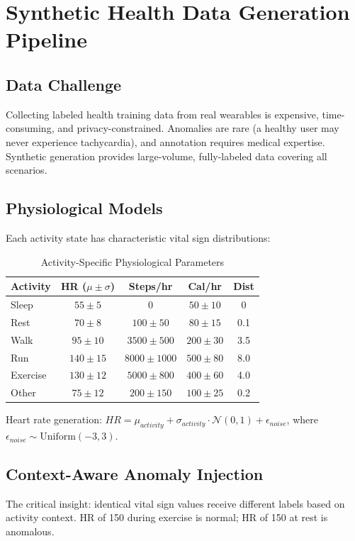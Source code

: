 \section{Synthetic Health Data Generation Pipeline}

\subsection{Data Challenge}
Collecting labeled health training data from real wearables is expensive, time-consuming, and privacy-constrained. Anomalies are rare (a healthy user may never experience tachycardia), and annotation requires medical expertise. Synthetic generation provides large-volume, fully-labeled data covering all scenarios.

\subsection{Physiological Models}
Each activity state has characteristic vital sign distributions:

\begin{table}[H]
\centering
\caption{Activity-Specific Physiological Parameters}
\label{tab:physio}
\begin{tabular}{lcccc}
\toprule
\textbf{Activity} & \textbf{HR ($\mu \pm \sigma$)} & \textbf{Steps/hr} & \textbf{Cal/hr} & \textbf{Dist} \\
\midrule
Sleep & $55 \pm 5$ & 0 & $50 \pm 10$ & 0 \\
Rest & $70 \pm 8$ & $100 \pm 50$ & $80 \pm 15$ & 0.1 \\
Walk & $95 \pm 10$ & $3500 \pm 500$ & $200 \pm 30$ & 3.5 \\
Run & $140 \pm 15$ & $8000 \pm 1000$ & $500 \pm 80$ & 8.0 \\
Exercise & $130 \pm 12$ & $5000 \pm 800$ & $400 \pm 60$ & 4.0 \\
Other & $75 \pm 12$ & $200 \pm 150$ & $100 \pm 25$ & 0.2 \\
\bottomrule
\end{tabular}
\end{table}

Heart rate generation: $HR = \mu_{activity} + \sigma_{activity} \cdot \mathcal{N}(0, 1) + \epsilon_{noise}$, where $\epsilon_{noise} \sim \text{Uniform}(-3, 3)$.

\subsection{Context-Aware Anomaly Injection}
The critical insight: identical vital sign values receive different labels based on activity context. HR of 150 during exercise is normal; HR of 150 at rest is anomalous.

